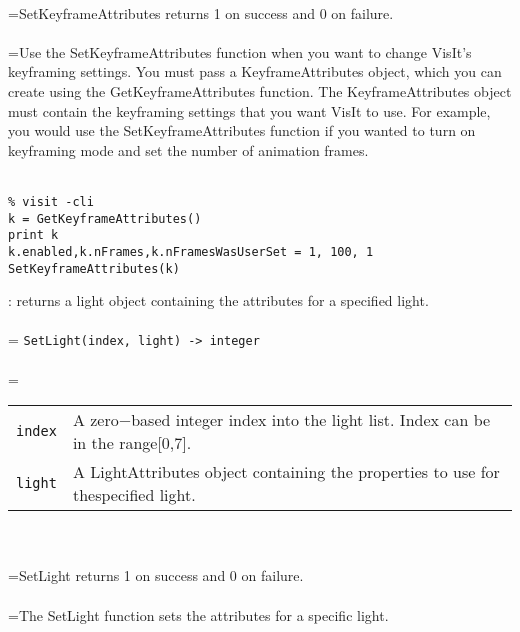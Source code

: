\documentclass[10pt,a4paper]{report}
\begin{document}
 \\ 
\hangindent=\parindent SetKeyframeAttributes returns 1 on success and 0 on failure. \\[-3mm] 

 \\ 
\hangindent=\parindent Use the SetKeyframeAttributes function when you want to change VisIt's keyframing settings. You must pass a KeyframeAttributes object, which you can create using the GetKeyframeAttributes function. The KeyframeAttributes object must contain the keyframing settings that you want VisIt to use. For example, you would use the SetKeyframeAttributes function if you wanted to turn on keyframing mode and set the number of animation frames. \\[-3mm] 

\\[-6mm]
\begin{verbatim}% visit -cli
k = GetKeyframeAttributes()
print k
k.enabled,k.nFrames,k.nFramesWasUserSet = 1, 100, 1
SetKeyframeAttributes(k)
\end{verbatim}
\newpage


{}
: returns a light object containing the attributes for a specified light.\\[-3mm]

 \\ 
\hangindent=\parindent 
\verb!SetLight(index, light) -> integer!\\ [-3mm]

 \\ 
\hangindent=\parindent 
\begin{tabular}{lp{9cm}}
\verb!index! & A zero$-$based integer index into the light list. Index can be in the range[0,7]. \\
\verb!light! & A LightAttributes object containing the properties to use for thespecified light. \\
\end{tabular} \\[-2mm]


 \\ 
\hangindent=\parindent SetLight returns 1 on success and 0 on failure. \\[-3mm] 

 \\ 
\hangindent=\parindent The SetLight function sets the attributes for a specific light.  \\[-3mm] 
\end{document}
